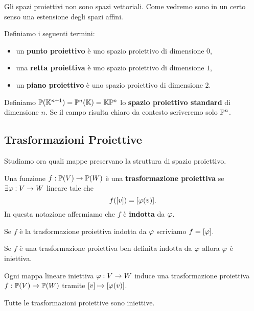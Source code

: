 \begin{multicols*}{2}
    \begin{remark}
    Gli spazi proiettivi non sono spazi vettoriali. Come vedremo sono in un certo senso una estensione degli spazi affini.
    \end{remark}

    \begin{definition}
    Definiamo i seguenti termini:
    \begin{itemize}[noitemsep]
    \item un \textbf{punto proiettivo} \`e uno spazio proiettivo di dimensione $0$,
    \item una \textbf{retta proiettiva} \`e uno spazio proiettivo di dimensione $1$,
    \item un \textbf{piano proiettivo} \`e uno spazio proiettivo di dimensione $2$.
    \end{itemize}
    \end{definition}

    \begin{definition}
    Definiamo $\mathbb{P}(\mathbb{K}^{n+1})=\mathbb{P}^{n}(\mathbb{K})=\mathbb{K}\mathbb{P}^{n}$ lo \textbf{spazio proiettivo standard} di dimensione $n$. Se il campo risulta chiaro da contesto scriveremo solo $\mathbb{P}^n$.
    \end{definition}

    \subsection{Trasformazioni Proiettive}

    Studiamo ora quali mappe preservano la struttura di spazio proiettivo.
    \begin{definition}
    Una funzione $f:{\mathbb{P}(V)}\to{\mathbb{P}(W)}$ \`e una \textbf{trasformazione proiettiva} se $\exists \varphi: V\to W$ lineare tale che
    \[f([v])=[\varphi(v)].\]
    In questa notazione affermiamo che $f$ \`e \textbf{indotta} da $\varphi$.
    \end{definition}
    \begin{notation}
    Se $f$ \`e la trasformazione proiettiva indotta da $\varphi$ scriviamo $f=[\varphi]$.
    \end{notation}

    \begin{remark}
    Se $f$ \`e una trasformazione proiettiva ben definita indotta da $\varphi$ allora $\varphi$ \`e iniettiva.
    \end{remark}

    \begin{remark}
    Ogni mappa lineare iniettiva $\varphi:V\to W$ induce una trasformazione proiettiva $f:{\mathbb{P}(V)}\to{\mathbb{P}(W)}$ tramite $[v]\mapsto[\varphi(v)]$.
    \end{remark}
    \begin{remark}
        Tutte le trasformazioni proiettive sono iniettive.
    \end{remark}


\end{multicols*}
